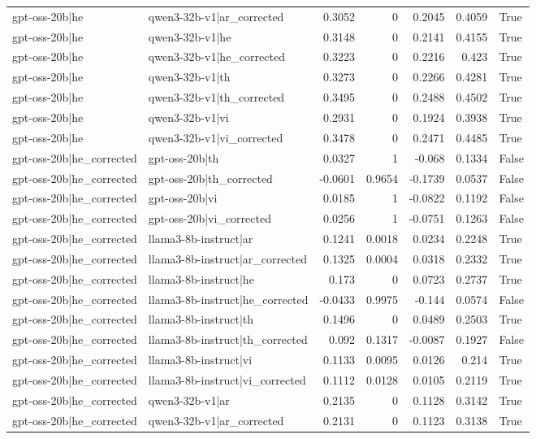 \begin{table}
\begin{tabular}{l l r r r r l}
gpt-oss-20b|he & qwen3-32b-v1|ar_corrected & 0.3052 & 0 & 0.2045 & 0.4059 & True \\
gpt-oss-20b|he & qwen3-32b-v1|he & 0.3148 & 0 & 0.2141 & 0.4155 & True \\
gpt-oss-20b|he & qwen3-32b-v1|he_corrected & 0.3223 & 0 & 0.2216 & 0.423 & True \\
gpt-oss-20b|he & qwen3-32b-v1|th & 0.3273 & 0 & 0.2266 & 0.4281 & True \\
gpt-oss-20b|he & qwen3-32b-v1|th_corrected & 0.3495 & 0 & 0.2488 & 0.4502 & True \\
gpt-oss-20b|he & qwen3-32b-v1|vi & 0.2931 & 0 & 0.1924 & 0.3938 & True \\
gpt-oss-20b|he & qwen3-32b-v1|vi_corrected & 0.3478 & 0 & 0.2471 & 0.4485 & True \\
gpt-oss-20b|he_corrected & gpt-oss-20b|th & 0.0327 & 1 & -0.068 & 0.1334 & False \\
gpt-oss-20b|he_corrected & gpt-oss-20b|th_corrected & -0.0601 & 0.9654 & -0.1739 & 0.0537 & False \\
gpt-oss-20b|he_corrected & gpt-oss-20b|vi & 0.0185 & 1 & -0.0822 & 0.1192 & False \\
gpt-oss-20b|he_corrected & gpt-oss-20b|vi_corrected & 0.0256 & 1 & -0.0751 & 0.1263 & False \\
gpt-oss-20b|he_corrected & llama3-8b-instruct|ar & 0.1241 & 0.0018 & 0.0234 & 0.2248 & True \\
gpt-oss-20b|he_corrected & llama3-8b-instruct|ar_corrected & 0.1325 & 0.0004 & 0.0318 & 0.2332 & True \\
gpt-oss-20b|he_corrected & llama3-8b-instruct|he & 0.173 & 0 & 0.0723 & 0.2737 & True \\
gpt-oss-20b|he_corrected & llama3-8b-instruct|he_corrected & -0.0433 & 0.9975 & -0.144 & 0.0574 & False \\
gpt-oss-20b|he_corrected & llama3-8b-instruct|th & 0.1496 & 0 & 0.0489 & 0.2503 & True \\
gpt-oss-20b|he_corrected & llama3-8b-instruct|th_corrected & 0.092 & 0.1317 & -0.0087 & 0.1927 & False \\
gpt-oss-20b|he_corrected & llama3-8b-instruct|vi & 0.1133 & 0.0095 & 0.0126 & 0.214 & True \\
gpt-oss-20b|he_corrected & llama3-8b-instruct|vi_corrected & 0.1112 & 0.0128 & 0.0105 & 0.2119 & True \\
gpt-oss-20b|he_corrected & qwen3-32b-v1|ar & 0.2135 & 0 & 0.1128 & 0.3142 & True \\
gpt-oss-20b|he_corrected & qwen3-32b-v1|ar_corrected & 0.2131 & 0 & 0.1123 & 0.3138 & True \\

\end{tabular}
\end{table}

